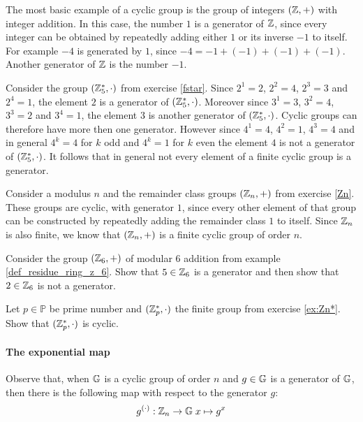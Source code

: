 \begin{example}
\label{example:cyclic_group_of_integers} The most basic example of a cyclic group is the group of integers $(\mathbb{Z},+)$ with integer addition. In this case, the number $1$ is a generator of $\mathbb{Z}$, since every integer can be obtained by repeatedly adding either $1$ or its inverse $-1$ to itself. For example $-4$ is generated by $1$, since $-4=-1+(-1)+(-1)+(-1)$. Another generator of $\mathbb{Z}$ is the number $-1$.
\end{example}
\begin{example}
\label{example:cyclic_group_F5*} Consider the group $(\mathbb{Z}_5^*,\cdot)$ from exercise \ref{fstar}. Since $2^1=2$, $2^2=4$, $2^3=3$ and $2^4=1$, the element $2$ is a generator of $(\mathbb{Z}_5^*,\cdot)$. Moreover since $3^1=3$, $3^2=4$, $3^3=2$ and $3^4=1$, the element $3$ is another generator of $(\mathbb{Z}_5^*,\cdot)$. Cyclic groups can therefore have more then one generator. However since $4^1=4$, $4^2=1$, $4^3=4$ and in general $4^k=4$ for $k$ odd and $4^k=1$ for $k$ even the element $4$ is not a generator of $(\mathbb{Z}_5^*,\cdot)$. It follows that in general not every element of a finite cyclic group is a generator.
\end{example}
\begin{example} Consider a modulus $n$ and the remainder class groups $(\mathbb{Z}_n,+)$ from exercise \ref{Zn}. These groups are cyclic, with generator $1$, since every other element of that group can be constructed by repeatedly adding the remainder class $1$ to itself. Since $\mathbb{Z}_n$ is also finite, we know that $(\mathbb{Z}_n,+)$ is a finite cyclic group of order $n$.
\end{example}
\begin{exercise}
\label{example:cyclic_group_F6}
Consider the group $(\mathbb{Z}_6,+)$ of modular 6 addition from example \ref{def_residue_ring_z_6}. Show that $5\in \mathbb{Z}_6$ is a generator and then show that $2\in \mathbb{Z}_6$ is not a generator.
\end{exercise}
\begin{exercise}\label{ex:modulus-prime-group} Let $p\in\mathbb{P}$ be prime number and $(\mathbb{Z}_p^*,\cdot)$ the finite group from exercise \ref{ex:Zn*}. Show that $(\mathbb{Z}_p^*,\cdot)$ is cyclic.
\end{exercise}

\paragraph{The exponential map}
Observe that, when $\mathbb{G}$ is a cyclic group of order $n$ and $g\in \mathbb{G}$ is a generator of $\mathbb{G}$, then there is the following map with respect to the generator $g$:
\begin{equation}\label{exponentialmap}
g^{(\cdot)}: \mathbb{Z}_n \to \mathbb{G}\; x \mapsto g^x
\end{equation}

